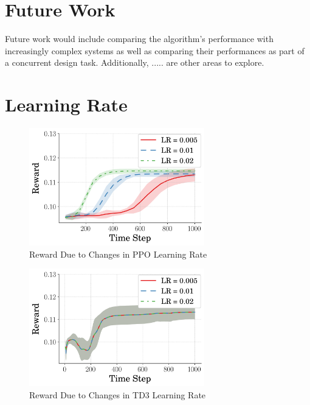 \documentclass[10pt,twocolumn,letterpaper]{article}
\begin{document}
\section{Future Work}
Future work would include comparing the algorithm's performance with increasingly complex systems as well as comparing their performances as part of a concurrent design task. Additionally, ..... are other areas 
to explore.


{\small


}

\appendix

\section{Learning Rate}
\label{app:lr_changes}
\begin{figure}[b]
\begin{center}
        \includegraphics[width=3in]{figures/comp_learning_rate/avg_rew_ppo.png}
        \caption{Reward Due to Changes in PPO Learning Rate}
        \label{fig:ppo_rew}
\end{center}
\end{figure}

\begin{figure}[tb]
\begin{center}
        \includegraphics[width=3in]{figures/comp_learning_rate/avg_rew_td3.png}
        \caption{Reward Due to Changes in TD3 Learning Rate}
        \label{fig:td3_rew}
\end{center}
\end{figure}
        
\end{document}
